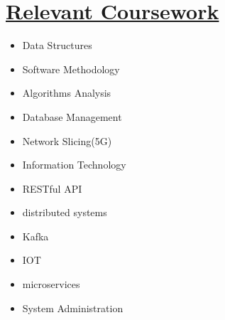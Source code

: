 \documentclass[letterpaper,11pt]{article}
\newcommand{\resumeSubHeadingListStart}{\begin{itemize}[leftmargin=0.0in, label={}]}
\newcommand{\resumeSubHeadingListEnd}{\end{itemize}}
\begin{document}
\section{\href{https://www.linkedin.com/in/yakkshit/details/courses/}{Relevant Coursework} }
        \begin{multicols}{4}
            \begin{itemize}[itemsep=-4pt, parsep=3pt]
                \item\small Data Structures
                \item Software Methodology
                \item Algorithms Analysis
                \item Database Management
                \item Network Slicing(5G)
                \item Information Technology
                \item RESTful API
                \item distributed systems \\
                \item Kafka
                \item IOT
                \item microservices
                \item System Administration\\
            \end{itemize}
        \end{multicols}
        \vspace*{2.0\multicolsep}

\end{document}
